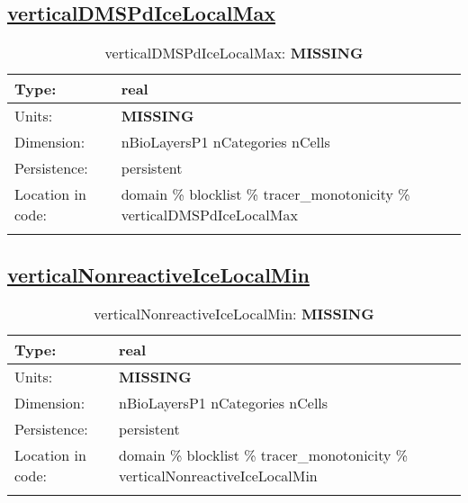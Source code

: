 \subsection[verticalDMSPdIceLocalMax]{\hyperref[sec:var_tab_tracer_monotonicity]{verticalDMSPdIceLocalMax}}
\label{subsec:var_sec_tracer_monotonicity_verticalDMSPdIceLocalMax}
\begin{center}
\begin{longtable}{| p{2.0in} | p{4.0in} |}
        \hline 
        Type: & real \\
        \hline 
        Units: & {\bf \color{red} MISSING} \\
        \hline 
        Dimension: & nBioLayersP1 nCategories nCells \\
        \hline 
        Persistence: & persistent \\
        \hline 
         Location in code: & domain \% blocklist \% tracer\_monotonicity \% verticalDMSPdIceLocalMax \\
         \hline 
    \caption{verticalDMSPdIceLocalMax: {\bf \color{red} MISSING}}
\end{longtable}
\end{center}
\subsection[verticalNonreactiveIceLocalMin]{\hyperref[sec:var_tab_tracer_monotonicity]{verticalNonreactiveIceLocalMin}}
\label{subsec:var_sec_tracer_monotonicity_verticalNonreactiveIceLocalMin}
\begin{center}
\begin{longtable}{| p{2.0in} | p{4.0in} |}
        \hline 
        Type: & real \\
        \hline 
        Units: & {\bf \color{red} MISSING} \\
        \hline 
        Dimension: & nBioLayersP1 nCategories nCells \\
        \hline 
        Persistence: & persistent \\
        \hline 
         Location in code: & domain \% blocklist \% tracer\_monotonicity \% verticalNonreactiveIceLocalMin \\
         \hline 
    \caption{verticalNonreactiveIceLocalMin: {\bf \color{red} MISSING}}
\end{longtable}
\end{center}
